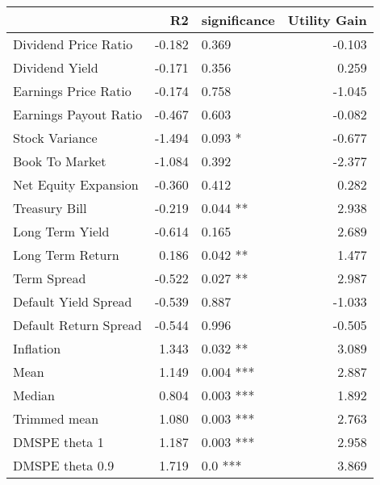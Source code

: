 \begin{tabular}{lrlr}
\toprule
{} &     R2 & significance &  Utility Gain \\
\midrule
Dividend Price Ratio  & -0.182 &       0.369  &        -0.103 \\
Dividend Yield        & -0.171 &       0.356  &         0.259 \\
Earnings Price Ratio  & -0.174 &       0.758  &        -1.045 \\
Earnings Payout Ratio & -0.467 &       0.603  &        -0.082 \\
Stock Variance        & -1.494 &      0.093 * &        -0.677 \\
Book To Market        & -1.084 &       0.392  &        -2.377 \\
Net Equity Expansion  & -0.360 &       0.412  &         0.282 \\
Treasury Bill         & -0.219 &     0.044 ** &         2.938 \\
Long Term Yield       & -0.614 &       0.165  &         2.689 \\
Long Term Return      &  0.186 &     0.042 ** &         1.477 \\
Term Spread           & -0.522 &     0.027 ** &         2.987 \\
Default Yield Spread  & -0.539 &       0.887  &        -1.033 \\
Default Return Spread & -0.544 &       0.996  &        -0.505 \\
Inflation             &  1.343 &     0.032 ** &         3.089 \\
Mean                  &  1.149 &    0.004 *** &         2.887 \\
Median                &  0.804 &    0.003 *** &         1.892 \\
Trimmed mean          &  1.080 &    0.003 *** &         2.763 \\
DMSPE theta 1         &  1.187 &    0.003 *** &         2.958 \\
DMSPE theta 0.9       &  1.719 &      0.0 *** &         3.869 \\
\bottomrule
\end{tabular}
